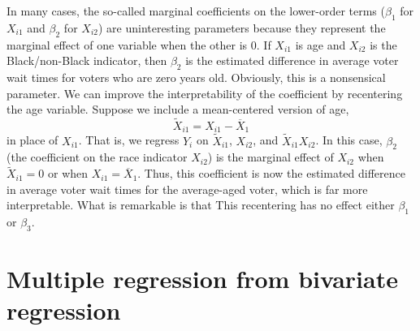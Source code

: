 \documentclass[
  letterpaper,
  DIV=11,
  numbers=noendperiod]{scrreprt}
\theoremstyle{definition}
\theoremstyle{definition}
\theoremstyle{plain}
\theoremstyle{remark}
\begin{document}
\begin{tcolorbox}[enhanced jigsaw, breakable, colback=white, left=2mm, colbacktitle=quarto-callout-note-color!10!white, rightrule=.15mm, toprule=.15mm, bottomtitle=1mm, toptitle=1mm, leftrule=.75mm, coltitle=black, arc=.35mm, title=\textcolor{quarto-callout-note-color}{\faInfo}\hspace{0.5em}{Centering variables to improve interpretability}, titlerule=0mm, colframe=quarto-callout-note-color-frame, bottomrule=.15mm, opacitybacktitle=0.6, opacityback=0]

In many cases, the so-called marginal coefficients on the lower-order
terms (\(\beta_1\) for \(X_{i1}\) and \(\beta_2\) for \(X_{i2}\)) are
uninteresting parameters because they represent the marginal effect of
one variable when the other is 0. If \(X_{i1}\) is age and \(X_{i2}\) is
the Black/non-Black indicator, then \(\beta_2\) is the estimated
difference in average voter wait times for voters who are zero years
old. Obviously, this is a nonsensical parameter. We can improve the
interpretability of the coefficient by recentering the age variable.
Suppose we include a mean-centered version of age, \[
\widetilde{X}_{i1} = X_{i1} - \overline{X}_1
\] in place of \(X_{i1}\). That is, we regress \(Y_i\) on
\(\widetilde{X}_{i1}\), \(X_{i2}\), and \(\widetilde{X}_{i1}X_{i2}\). In
this case, \(\beta_2\) (the coefficient on the race indicator
\(X_{i2}\)) is the marginal effect of \(X_{i2}\) when
\(\widetilde{X}_{i1} = 0\) or when \(X_{i1} = \overline{X}_1\). Thus,
this coefficient is now the estimated difference in average voter wait
times for the average-aged voter, which is far more interpretable. What
is remarkable is that This recentering has no effect either \(\beta_1\)
or \(\beta_3\).

\end{tcolorbox}

\hypertarget{sec-fwl}{%
\section{Multiple regression from bivariate regression}\label{sec-fwl}}
\end{document}
